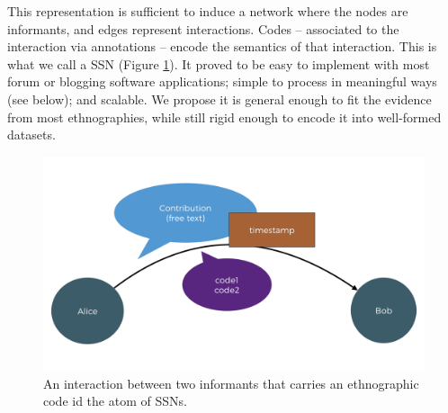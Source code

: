 \documentclass{llncs}
\begin{document}
This representation is sufficient to induce a network where the nodes are informants, and edges represent interactions. Codes – associated to the interaction via annotations – encode the semantics of that interaction. This is what we call a SSN (Figure \ref{fig:SSN}). It proved to be easy to implement with most forum or blogging software applications;  simple to process in meaningful ways (see below); and scalable. We propose it is general enough to fit the evidence from most ethnographies, while still rigid enough to encode it into well-formed datasets. 

\begin{figure}[h!]
\centering
\includegraphics[scale=0.13]{images/SSN.jpeg}
\caption{An interaction between two informants that carries an ethnographic code id the atom of SSNs.}
\label{fig:SSN}
\end{figure}


%
%
\end{document}
